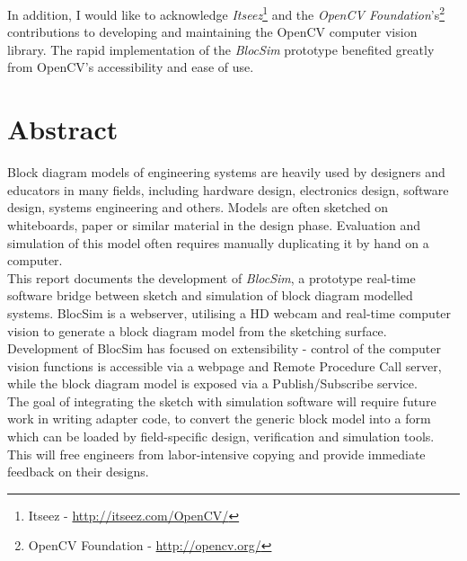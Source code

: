 In addition, I would like to acknowledge \textit{Itseez}\footnote{Itseez - \url{http://itseez.com/OpenCV/}} and the \textit{OpenCV Foundation}'s\footnote{OpenCV Foundation - \url{http://opencv.org/}} contributions to developing and maintaining the OpenCV computer vision library. The rapid implementation of the \textit{BlocSim} prototype benefited greatly from OpenCV's accessibility and ease of use.


\chapter{Abstract}

Block diagram models of engineering systems are heavily used by designers and educators in many fields, including hardware design, electronics design, software design, systems engineering and others. Models are often sketched on whiteboards, paper or similar material in the design phase. Evaluation and simulation of this model often requires manually duplicating it by hand on a computer.
\\

This report documents the development of \textit{BlocSim}, a prototype real-time software bridge between sketch and simulation of block diagram modelled systems. BlocSim is a webserver, utilising a HD webcam and real-time computer vision to generate a block diagram model from the sketching surface. Development of BlocSim has focused on extensibility - control of the computer vision functions is accessible via a webpage and Remote Procedure Call server, while the block diagram model is exposed via a Publish/Subscribe service.
\\

The goal of integrating the sketch with simulation software will require future work in writing adapter code, to convert the generic block model into a form which can be loaded by field-specific design, verification and simulation tools. This will free engineers from labor-intensive copying and provide immediate feedback on their designs.


\begin{comment}

\end{comment}
